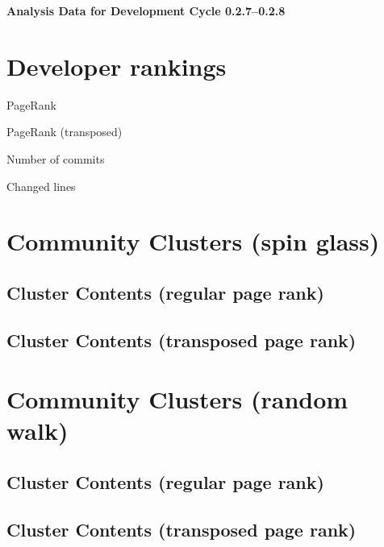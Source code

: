 \documentclass{article}
\begin{document}
\setlength{\parindent}{0pt}
\begin{center}
\begin{Large}
\textbf{Analysis Data for Development Cycle 0.2.7--0.2.8}
\end{Large}
\end{center}
\section{Developer rankings}
\begin{small}\renewcommand{\tabcolsep}{1pt}
\begin{minipage}{0.5\linewidth}
PageRank\\

\end{minipage}%
\begin{minipage}{0.5\linewidth}
PageRank (transposed)\\

\end{minipage}

\renewcommand{\tabcolsep}{5pt}
\begin{minipage}{0.5\linewidth}
Number of commits\\

\end{minipage}%
\begin{minipage}{0.5\linewidth}
Changed lines\\

\end{minipage}
\end{small}
\newpage\section{Community Clusters (spin glass)}
\subsection{Cluster Contents (regular page rank)}
\newpage\subsection{Cluster Contents (transposed page rank)}
\newpage\section{Community Clusters (random walk)}
\subsection{Cluster Contents (regular page rank)}
\newpage\subsection{Cluster Contents (transposed page rank)}
\end{document}
